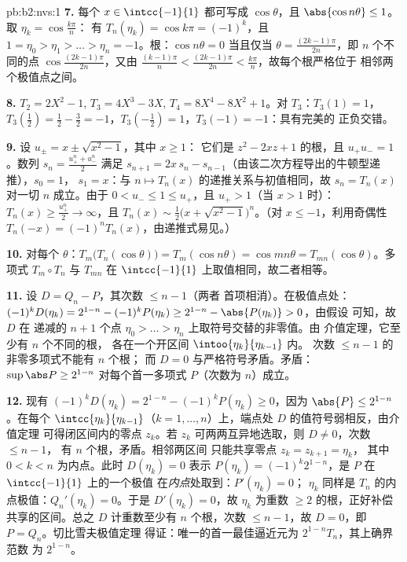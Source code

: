 \begin{solution}{pb:b2:nvs:1}
\textbf{7.} 每个 $x \in \intcc{-1}{1}$ 都可写成 $\cos\theta$，且
$\abs{\cos n\theta} \leq 1$。取 $\eta_k = \cos\frac{k\pi}n$：
有 $T_n(\eta_k) = \cos k\pi = (-1)^k$，且 $1 = \eta_0 > \eta_1 >
\dots > \eta_n = -1$。根：$\cos n\theta = 0$ 当且仅当 $\theta =
\frac{(2k-1)\pi}{2n}$，即 $n$ 个不同的点
$\cos\frac{(2k-1)\pi}{2n}$，又由 $\frac{(k-1)\pi}n <
\frac{(2k-1)\pi}{2n} < \frac{k\pi}n$，故每个根严格位于
相邻两个极值点之间。

\textbf{8.} $T_2 = 2X^2 - 1$, $T_3 = 4X^3 - 3X$, $T_4 = 8X^4 -
8X^2 + 1$。对 $T_3$：$T_3(1) = 1$，$T_3(\tfrac12) = \tfrac12 -
\tfrac32 = -1$，$T_3(-\tfrac12) = 1$，$T_3(-1) = -1$：具有完美的
正负交错。

\textbf{9.} 设 $u_\pm = x \pm \sqrt{x^2 - 1}$，其中 $x \geq 1$：
它们是 $z^2 - 2xz + 1$ 的根，且 $u_+u_- = 1$。数列
$s_n = \frac{u_+^n + u_-^n}2$ 满足 $s_{n+1} = 2x\,s_n -
s_{n-1}$（由该二次方程导出的牛顿型递推），$s_0 = 1$，
$s_1 = x$：与 $n \mapsto
T_n(x)$ 的递推关系与初值相同，故 $s_n = T_n(x)$ 对一切 $n$ 成立。由于 $0 < u_- \leq 1
\leq u_+$，且 $u_+ > 1$（当 $x > 1$ 时）：$T_n(x) \geq
\frac{u_+^n}2 \to \infty$，且 $T_n(x) \sim \frac12\bigl(x +
\sqrt{x^2-1}\bigr)^n$。（对 $x \leq -1$，利用奇偶性 $T_n(-x)
= (-1)^nT_n(x)$，由递推式易见。）

\textbf{10.} 对每个 $\theta$：$T_m\bigl(T_n(\cos\theta)\bigr)
= T_m(\cos n\theta) = \cos mn\theta =
T_{mn}(\cos\theta)$。多项式 $T_m \circ T_n$ 与
$T_{mn}$ 在 $\intcc{-1}{1}$ 上取值相同，故二者相等。

\textbf{11.} 设 $D = Q_n - P$，其次数 $\leq n - 1$（两者
首项相消）。在极值点处：$(-1)^kD(\eta_k) =
2^{1-n} - (-1)^kP(\eta_k) \geq 2^{1-n} - \abs{P(\eta_k)} > 0$，由假设
可知，故 $D$ 在
递减的 $n + 1$ 个点 $\eta_0 > \dots > \eta_n$ 上取符号交替的非零值。由
介值定理，它至少有 $n$ 个不同的根，
各在一个开区间 $\intoo{\eta_{k}}{\eta_{k-1}}$ 内。
次数 $\leq n - 1$ 的非零多项式不能有 $n$ 个根；
而 $D = 0$ 与严格符号矛盾。矛盾：
$\sup\abs P \geq 2^{1-n}$ 对每个首一多项式 $P$（次数为 $n$）成立。

\textbf{12.} 现有 $(-1)^kD(\eta_k) = 2^{1-n} - (-1)^kP(\eta_k)
\geq 0$，因为 $\abs{P} \leq 2^{1-n}$。在每个
$\intcc{\eta_k}{\eta_{k-1}}$（$k = 1, \dots, n$）上，端点处
$D$ 的值符号弱相反，由介值定理
可得闭区间内的零点 $z_k$。若 $z_k$
可两两互异地选取，则 $D \neq 0$，次数 $\leq n-1$，
有 $n$ 个根，矛盾。相邻两区间
只能共享零点 $z_k = z_{k+1} = \eta_k$，
其中 $0 < k < n$ 为内点。此时 $D(\eta_k) = 0$ 表示 $P(\eta_k) =
(-1)^k2^{1-n}$，是 $P$ 在 $\intcc{-1}{1}$ 上的一个极值
在\emph{内点}处取到：$P'(\eta_k) = 0$；
$\eta_k$ 同样是 $T_n$ 的内点极值：$Q_n'(\eta_k) =
0$。于是 $D'(\eta_k) = 0$，故 $\eta_k$ 为重数
$\geq 2$ 的根，正好补偿共享的区间。总之 $D$
计重数至少有 $n$ 个根，次数 $\leq n -
1$，故 $D = 0$，即 $P = Q_n$。切比雪夫极值定理
得证：唯一的首一最佳逼近元为 $2^{1-n}T_n$，其上确界范数
为 $2^{1-n}$。


\end{solution}
